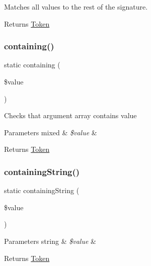 Matches all values to the rest of the signature.

\begin{DoxyReturn}{Returns}
\mbox{\hyperlink{namespace_prophecy_1_1_argument_1_1_token}{Token}} 
\end{DoxyReturn}
\mbox{\label{class_prophecy_1_1_argument_aaca8ed069c331e41bbc7d9853be36066}} 
\subsubsection{\texorpdfstring{containing()}{containing()}}
{\footnotesize\ttfamily static containing (\begin{DoxyParamCaption}\item[{}]{\$value }\end{DoxyParamCaption})\hspace{0.3cm}{\ttfamily [static]}}

Checks that argument array contains value


\begin{DoxyParams}[1]{Parameters}
mixed & {\em \$value} & \\
\hline
\end{DoxyParams}
\begin{DoxyReturn}{Returns}
\mbox{\hyperlink{namespace_prophecy_1_1_argument_1_1_token}{Token}} 
\end{DoxyReturn}
\mbox{\label{class_prophecy_1_1_argument_a09d9db103ffc22f4be2e66104f57e488}} 
\subsubsection{\texorpdfstring{containing\+String()}{containingString()}}
{\footnotesize\ttfamily static containing\+String (\begin{DoxyParamCaption}\item[{}]{\$value }\end{DoxyParamCaption})\hspace{0.3cm}{\ttfamily [static]}}


\begin{DoxyParams}[1]{Parameters}
string & {\em \$value} & \\
\hline
\end{DoxyParams}
\begin{DoxyReturn}{Returns}
\mbox{\hyperlink{namespace_prophecy_1_1_argument_1_1_token}{Token}} 
\end{DoxyReturn}
\mbox{\label{class_prophecy_1_1_argument_af5996abc227f6270f8593f56a3bfe8aa}} 
